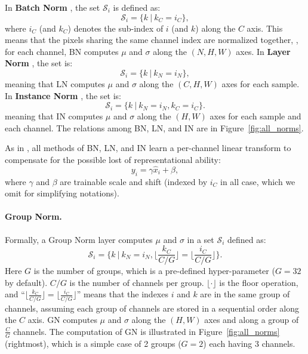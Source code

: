 \documentclass[10pt,twocolumn,letterpaper]{article}
\begin{document}
In \textbf{Batch Norm} \cite{Ioffe2015}, the set $\mathcal{S}_i$ is defined as:
\begin{equation}\label{eq:set_bn}
\mathcal{S}_i = \{k~|~k_C=i_C\},
\end{equation}
where $i_C$ (and $k_C$) denotes the sub-index of $i$ (and $k$) along the $C$ axis. This means that the pixels sharing the same channel index are normalized together, \ie, for each channel, BN computes $\mu$ and $\sigma$ along the $(N, H, W)$ axes.
In \textbf{Layer Norm} \cite{Ba2016}, the set is:
\begin{equation}\label{eq:set_ln}
\mathcal{S}_i = \{k~|~k_N=i_N\},
\end{equation}
meaning that LN computes $\mu$ and $\sigma$ along the $(C, H, W)$ axes for each sample.
In \textbf{Instance Norm} \cite{Ulyanov2016}, the set is:
\begin{equation}\label{eq:set_in}
\mathcal{S}_i = \{k~|~k_N=i_N, k_C=i_C\}.
\end{equation}
meaning that IN computes $\mu$ and $\sigma$ along the $(H, W)$ axes for each sample and each channel.
The relations among BN, LN, and IN are in Figure~\ref{fig:all_norms}.

As in \cite{Ioffe2015}, all methods of BN, LN, and IN learn a per-channel linear transform to compensate for the possible lost of representational ability:
\begin{equation}\label{eq:gamma_beta}
y_i = \gamma \hat{x}_i + \beta,
\end{equation}
where $\gamma$ and $\beta$ are trainable scale and shift (indexed by $i_C$ in all case, which we omit for simplifying notations).

\paragraph{Group Norm.}
Formally, a Group Norm layer computes $\mu$ and $\sigma$ in a set $\mathcal{S}_i$ defined as:
\begin{equation}\label{eq:set_gn}
\mathcal{S}_i = \{k~|~k_N=i_N, \lfloor \frac{k_C}{C/G} \rfloor=\lfloor \frac{i_C}{C/G} \rfloor\}.
\end{equation}
Here $G$ is the number of groups, which is a pre-defined hyper-parameter ($G=32$ by default). $C/G$ is the number of channels per group.
$\lfloor\cdot\rfloor$ is the floor operation, and ``$\lfloor \frac{k_C}{C/G} \rfloor=\lfloor \frac{i_C}{C/G}\rfloor$'' means that the indexes $i$ and $k$ are in the same group of channels, assuming each group of channels are stored in a sequential order along the $C$ axis.
GN computes $\mu$ and $\sigma$ along the $(H, W)$ axes and along a group of $\frac{C}{G}$ channels.
The computation of GN is illustrated in Figure~\ref{fig:all_norms} (rightmost), which is a simple case of 2 groups ($G=2$) each having 3 channels.
\end{document}
